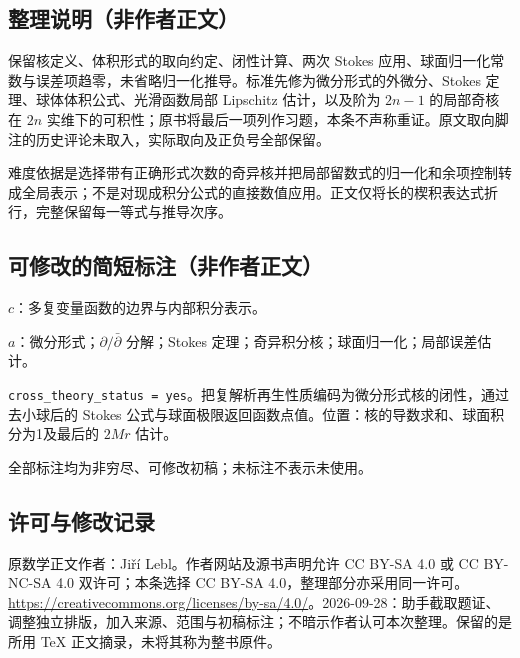 \documentclass[UTF8,11pt]{ctexart}
\theoremstyle{definition}
\begin{document}
\subsection*{整理说明（非作者正文）}
保留核定义、体积形式的取向约定、闭性计算、两次 Stokes 应用、球面归一化常数与误差项趋零，未省略归一化推导。标准先修为微分形式的外微分、Stokes 定理、球体体积公式、光滑函数局部 Lipschitz 估计，以及阶为 $2n-1$ 的局部奇核在 $2n$ 实维下的可积性；原书将最后一项列作习题，本条不声称重证。原文取向脚注的历史评论未取入，实际取向及正负号全部保留。

难度依据是选择带有正确形式次数的奇异核并把局部留数式的归一化和余项控制转成全局表示；不是对现成积分公式的直接数值应用。正文仅将长的楔积表达式折行，完整保留每一等式与推导次序。
\subsection*{可修改的简短标注（非作者正文）}
$c$：多复变量函数的边界与内部积分表示。

$a$：微分形式；$\partial/\bar\partial$ 分解；Stokes 定理；奇异积分核；球面归一化；局部误差估计。

\texttt{cross\_theory\_status = yes}。把复解析再生性质编码为微分形式核的闭性，通过去小球后的 Stokes 公式与球面极限返回函数点值。位置：核的导数求和、球面积分为1及最后的 $2Mr$ 估计。

全部标注均为非穷尽、可修改初稿；未标注不表示未使用。
\subsection*{许可与修改记录}
原数学正文作者：Ji\v{r}\'i Lebl。作者网站及源书声明允许 CC BY-SA 4.0 或 CC BY-NC-SA 4.0 双许可；本条选择 CC BY-SA 4.0，整理部分亦采用同一许可。\url{https://creativecommons.org/licenses/by-sa/4.0/}。2026-09-28：助手截取题证、调整独立排版，加入来源、范围与初稿标注；不暗示作者认可本次整理。保留的是所用 TeX 正文摘录，未将其称为整书原件。
\end{document}
